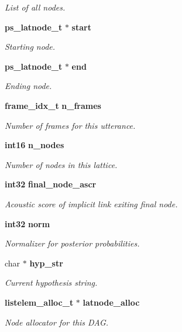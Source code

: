\begin{DoxyCompactItemize}
\begin{DoxyCompactList}\small\item\em \-List of all nodes. \end{DoxyCompactList}\item 
{\bf ps\-\_\-latnode\-\_\-t} $\ast$ {\bf start}
\begin{DoxyCompactList}\small\item\em \-Starting node. \end{DoxyCompactList}\item 
{\bf ps\-\_\-latnode\-\_\-t} $\ast$ {\bf end}
\begin{DoxyCompactList}\small\item\em \-Ending node. \end{DoxyCompactList}\item 
{\bf frame\-\_\-idx\-\_\-t} {\bf n\-\_\-frames}
\begin{DoxyCompactList}\small\item\em \-Number of frames for this utterance. \end{DoxyCompactList}\item 
{\bf int16} {\bf n\-\_\-nodes}
\begin{DoxyCompactList}\small\item\em \-Number of nodes in this lattice. \end{DoxyCompactList}\item 
{\bf int32} {\bf final\-\_\-node\-\_\-ascr}
\begin{DoxyCompactList}\small\item\em \-Acoustic score of implicit link exiting final node. \end{DoxyCompactList}\item 
{\bf int32} {\bf norm}
\begin{DoxyCompactList}\small\item\em \-Normalizer for posterior probabilities. \end{DoxyCompactList}\item 
char $\ast$ {\bf hyp\-\_\-str}
\begin{DoxyCompactList}\small\item\em \-Current hypothesis string. \end{DoxyCompactList}\item 
{\bf listelem\-\_\-alloc\-\_\-t} $\ast$ {\bf latnode\-\_\-alloc}
\begin{DoxyCompactList}\small\item\em \-Node allocator for this \-D\-A\-G. \end{DoxyCompactList}\item 

\end{DoxyCompactItemize}
